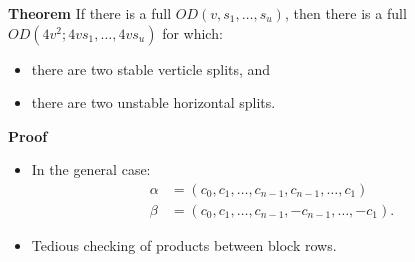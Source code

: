 \documentclass{beamer}
\begin{document}
\begin{frame}

  \begin{block}{{\bf Theorem} \cite[][]{split-od}}
    If there is a full $OD(v,s_1,\dots,s_u)$, then there is a full $OD(4v^2; 4vs_1, \dots, 4vs_u)$ for which:
    \begin{itemize}
    \item there are two stable verticle splits, and
    \item there are two unstable horizontal splits.
    \end{itemize}
  \end{block}

  \begin{block}{{\bf Proof}}
    \begin{itemize}
    \item In the general case:
      \begin{align*}
        \alpha &= (c_0, c_1, \dots, c_{n-1},c_{n-1},\dots,c_1) \\
        \beta &= (c_0, c_1, \dots, c_{n-1},-c_{n-1},\dots,-c_1).
      \end{align*}
    \item Tedious checking of products between block rows.
    \end{itemize}
  \end{block}
  
\end{frame}
\end{document}
